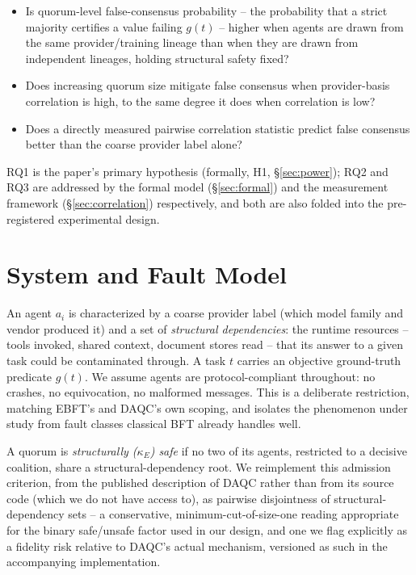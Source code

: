 \documentclass[journal]{IEEEtran}
\begin{document}
\begin{itemize}
\item[\textbf{RQ1}] Is quorum-level false-consensus probability -- the probability that a strict majority certifies a value failing $g(t)$ -- higher when agents are drawn from the same provider/training lineage than when they are drawn from independent lineages, holding structural safety fixed?
\item[\textbf{RQ2}] Does increasing quorum size mitigate false consensus when provider-basis correlation is high, to the same degree it does when correlation is low?
\item[\textbf{RQ3}] Does a directly measured pairwise correlation statistic predict false consensus better than the coarse provider label alone?
\end{itemize}

RQ1 is the paper's primary hypothesis (formally, H1, \S\ref{sec:power}); RQ2 and RQ3 are addressed by the formal model (\S\ref{sec:formal}) and the measurement framework (\S\ref{sec:correlation}) respectively, and both are also folded into the pre-registered experimental design.

\section{System and Fault Model}
\label{sec:system-model}

An agent $a_i$ is characterized by a coarse provider label (which model family and vendor produced it) and a set of \emph{structural dependencies}: the runtime resources -- tools invoked, shared context, document stores read -- that its answer to a given task could be contaminated through. A task $t$ carries an objective ground-truth predicate $g(t)$. We assume agents are protocol-compliant throughout: no crashes, no equivocation, no malformed messages. This is a deliberate restriction, matching EBFT's and DAQC's own scoping, and isolates the phenomenon under study from fault classes classical BFT already handles well.

\label{sec:structural}
A quorum is \emph{structurally ($\kappa_E$) safe} if no two of its agents, restricted to a decisive coalition, share a structural-dependency root. We reimplement this admission criterion, from the published description of DAQC rather than from its source code (which we do not have access to), as pairwise disjointness of structural-dependency sets -- a conservative, minimum-cut-of-size-one reading appropriate for the binary safe/unsafe factor used in our design, and one we flag explicitly as a fidelity risk relative to DAQC's actual mechanism, versioned as such in the accompanying implementation.
\end{document}
